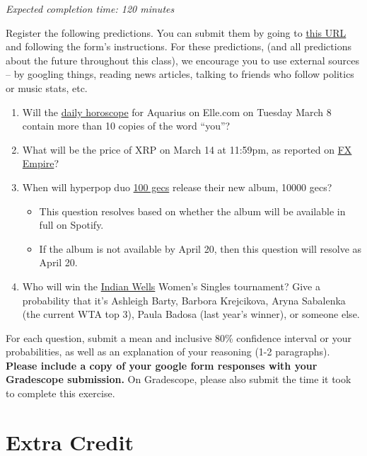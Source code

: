 \documentclass[11pt]{article}
\begin{document}
\emph{Expected completion time: 120 minutes}

Register the following predictions. You can submit them by going to \href{https://docs.google.com/forms/d/e/1FAIpQLSfGARO8mpj0GiFtOKuuVa9eBnkq6g2dTJU53qfqTmhQLDaZFg/viewform?usp=sf_link}{this URL} and following the form's instructions. For these predictions, (and all predictions about the future throughout this class), we encourage you to use external sources -- by googling things, reading news articles, talking to friends who follow politics or music stats, etc.

\begin{enumerate}
	\item Will the \href{https://www.elle.com/horoscopes/daily/a107/aquarius-daily-horoscope/}{daily horoscope} for Aquarius on Elle.com on Tuesday March 8 contain more than 10 copies of the word ``you''?
	\item What will be the price of XRP on March 14 at 11:59pm, as reported on \href{https://www.fxempire.com/crypto/xrp}{FX Empire}?
	\item When will hyperpop duo \href{https://en.wikipedia.org/wiki/100_Gecs}{100 gecs} release their new album, 10000 gecs?
	\begin{itemize}
		\item This question resolves based on whether the album will be available in full on Spotify.
		\item If the album is not available by April 20, then this question will resolve as April 20.
	\end{itemize}
	\item Who will win the \href{https://bnpparibasopen.com/players/current/?assoc=wta&type=singles}{Indian Wells} Women's Singles tournament? Give a probability that it's Ashleigh Barty, Barbora Krejcikova, Aryna Sabalenka (the current WTA top 3), Paula Badosa (last year's winner), or someone else.
\end{enumerate}

For each question, submit a mean and inclusive 80\% confidence interval or your probabilities, as well as an explanation of your reasoning (1-2 paragraphs). \textbf{Please include a copy of your google form responses with your Gradescope submission.} On Gradescope, please also submit the time it took to complete this exercise.

\section*{Extra Credit}
\end{document}
